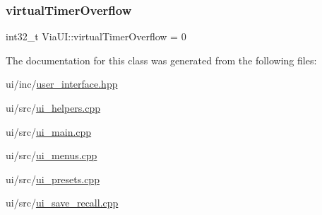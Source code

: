 \mbox{\label{class_via_u_i_ad3c77ffd0df89def606de5120e4ace3a}} 
\subsubsection{\texorpdfstring{virtual\+Timer\+Overflow}{virtualTimerOverflow}}
{\footnotesize\ttfamily int32\+\_\+t Via\+U\+I\+::virtual\+Timer\+Overflow = 0}



The documentation for this class was generated from the following files\+:\begin{DoxyCompactItemize}
\item 
ui/inc/\mbox{\hyperlink{user__interface_8hpp}{user\+\_\+interface.\+hpp}}\item 
ui/src/\mbox{\hyperlink{ui__helpers_8cpp}{ui\+\_\+helpers.\+cpp}}\item 
ui/src/\mbox{\hyperlink{ui__main_8cpp}{ui\+\_\+main.\+cpp}}\item 
ui/src/\mbox{\hyperlink{ui__menus_8cpp}{ui\+\_\+menus.\+cpp}}\item 
ui/src/\mbox{\hyperlink{ui__presets_8cpp}{ui\+\_\+presets.\+cpp}}\item 
ui/src/\mbox{\hyperlink{ui__save__recall_8cpp}{ui\+\_\+save\+\_\+recall.\+cpp}}\end{DoxyCompactItemize}
